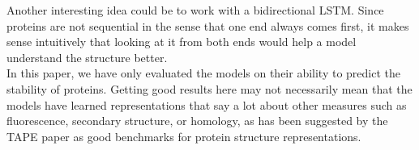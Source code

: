 \noindent
Another interesting idea could be to work with a bidirectional LSTM. Since proteins are not sequential in the sense that one end always comes first, it makes sense intuitively that looking at it from both ends would help a model understand the structure better.\\

\noindent
In this paper, we have only evaluated the models on their ability to predict the stability of proteins. Getting good results here may not necessarily mean that the models have learned representations that say a lot about other measures such as fluorescence, secondary structure, or homology, as has been suggested by the TAPE paper\cite{tape} as good benchmarks for protein structure representations.